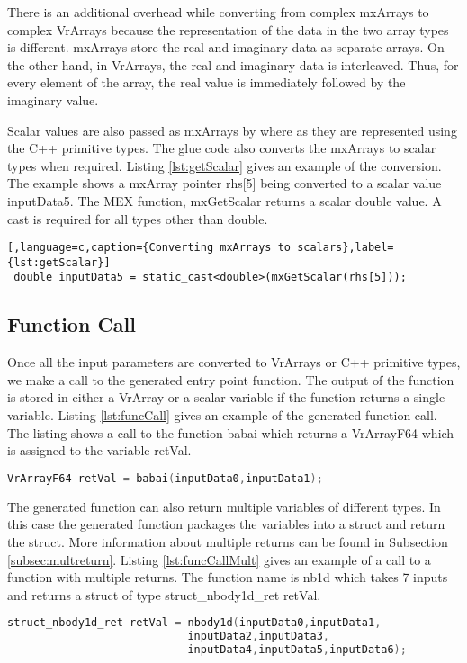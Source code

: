 There is an additional overhead while converting from complex mxArrays to complex VrArrays because the representation of the data in the two array types is different. mxArrays store the real and imaginary data as separate arrays. On the other hand, in VrArrays, the real and imaginary data is interleaved. Thus, for every element of the array, the real value is immediately followed by the imaginary value.

Scalar values are also passed as mxArrays by \matlab where as they are represented using the C++ primitive types. The glue code also converts the mxArrays to scalar types when required. Listing \ref{lst:getScalar} gives an example of the conversion. The example shows a mxArray pointer rhs[5] being converted to a scalar value inputData5. The MEX function, mxGetScalar returns a scalar double value. A cast is required for all types other than double.
\begin{lstlisting}[,language=c,caption={Converting mxArrays to scalars},label={lst:getScalar}]
 double inputData5 = static_cast<double>(mxGetScalar(rhs[5]));
\end{lstlisting}

\subsection{Function Call}
Once all the input parameters are converted to VrArrays or C++ primitive types, we make a call to the generated entry point function. The output of the function is stored in either a VrArray or a scalar variable if the function returns a single variable. Listing \ref{lst:funcCall} gives an example of the generated function call. The listing shows a call to the function babai which returns a VrArrayF64 which is assigned to the variable retVal.
\begin{lstlisting}[language=c,caption={Call to generated function},label={lst:funcCall}]
VrArrayF64 retVal = babai(inputData0,inputData1);
\end{lstlisting}

The generated function can also return multiple variables of different types. In this case the generated function packages the  variables into a struct and return the struct. More information about multiple returns can be found in Subsection \ref{subsec:multreturn}. Listing \ref{lst:funcCallMult} gives an example of a call to a function with multiple returns. The function name is nb1d which takes 7 inputs and returns a struct of type struct\_nbody1d\_ret retVal.
\begin{lstlisting}[language=c,caption={Call to generated function},label={lst:funcCallMult}]
struct_nbody1d_ret retVal = nbody1d(inputData0,inputData1,
							inputData2,inputData3,
							inputData4,inputData5,inputData6);
\end{lstlisting}
